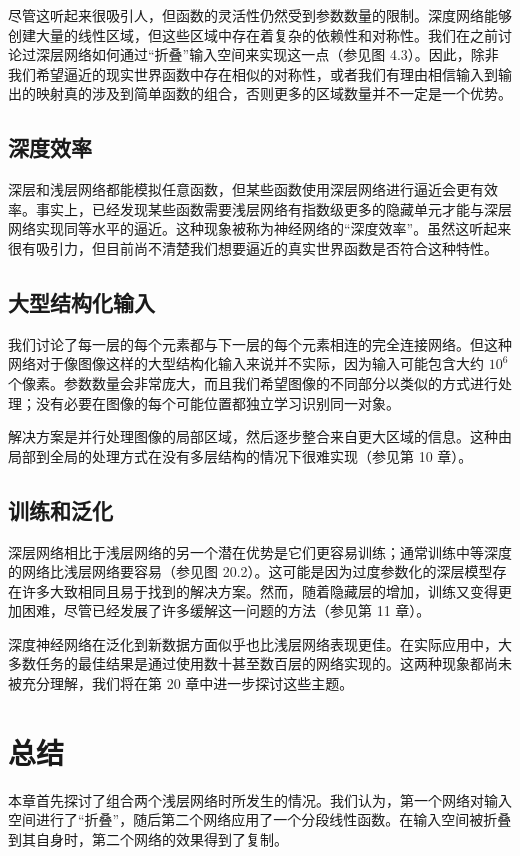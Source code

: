 尽管这听起来很吸引人，但函数的灵活性仍然受到参数数量的限制。深度网络能够创建大量的线性区域，但这些区域中存在着复杂的依赖性和对称性。我们在之前讨论过深层网络如何通过“折叠”输入空间来实现这一点（参见图 4.3）。因此，除非我们希望逼近的现实世界函数中存在相似的对称性，或者我们有理由相信输入到输出的映射真的涉及到简单函数的组合，否则更多的区域数量并不一定是一个优势。

\subsection{深度效率}
深层和浅层网络都能模拟任意函数，但某些函数使用深层网络进行逼近会更有效率。事实上，已经发现某些函数需要浅层网络有指数级更多的隐藏单元才能与深层网络实现同等水平的逼近。这种现象被称为神经网络的“深度效率”。虽然这听起来很有吸引力，但目前尚不清楚我们想要逼近的真实世界函数是否符合这种特性。

\subsection{大型结构化输入}
我们讨论了每一层的每个元素都与下一层的每个元素相连的完全连接网络。但这种网络对于像图像这样的大型结构化输入来说并不实际，因为输入可能包含大约 $10^6$ 个像素。参数数量会非常庞大，而且我们希望图像的不同部分以类似的方式进行处理；没有必要在图像的每个可能位置都独立学习识别同一对象。

解决方案是并行处理图像的局部区域，然后逐步整合来自更大区域的信息。这种由局部到全局的处理方式在没有多层结构的情况下很难实现（参见第 10 章）。

\subsection{训练和泛化}
深层网络相比于浅层网络的另一个潜在优势是它们更容易训练；通常训练中等深度的网络比浅层网络要容易（参见图 20.2）。这可能是因为过度参数化的深层模型存在许多大致相同且易于找到的解决方案。然而，随着隐藏层的增加，训练又变得更加困难，尽管已经发展了许多缓解这一问题的方法（参见第 11 章）。

深度神经网络在泛化到新数据方面似乎也比浅层网络表现更佳。在实际应用中，大多数任务的最佳结果是通过使用数十甚至数百层的网络实现的。这两种现象都尚未被充分理解，我们将在第 20 章中进一步探讨这些主题。
\section{总结}
本章首先探讨了组合两个浅层网络时所发生的情况。我们认为，第一个网络对输入空间进行了“折叠”，随后第二个网络应用了一个分段线性函数。在输入空间被折叠到其自身时，第二个网络的效果得到了复制。

